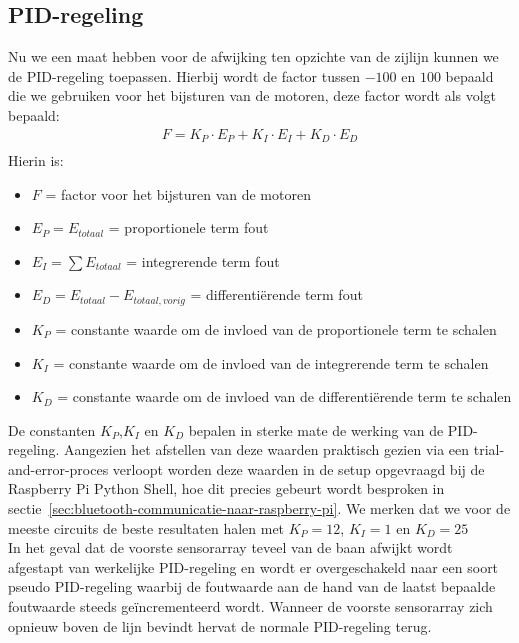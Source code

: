 \subsection{PID-regeling}
Nu we een maat hebben voor de afwijking ten opzichte van de zijlijn kunnen we de PID-regeling toepassen. Hierbij wordt de factor tussen $-100$ en $100$ bepaald die we gebruiken voor het bijsturen van de motoren, deze factor wordt als volgt bepaald:
\begin{gather*}
	F = K_P \cdot E_P + K_I \cdot E_I + K_D \cdot E_D\\
\end{gather*}
Hierin is:
\begin{itemize}
	\item $F$ = factor voor het bijsturen van de motoren
	\item $E_P = E_{totaal}$ = proportionele term fout
	\item $E_I = \sum E_{totaal}$ = integrerende term fout
	\item $E_D = E_{totaal} - E_{totaal,vorig}$ = differenti\"erende term fout
	\item $K_P$ = constante waarde om de invloed van de proportionele term te schalen
	\item $K_I$ = constante waarde om de invloed van de integrerende term te schalen
	\item $K_D$ = constante waarde om de invloed van de differenti\"erende term te schalen
\end{itemize}
De constanten $K_P$,$K_I$ en $K_D$ bepalen in sterke mate de werking van de PID-regeling. Aangezien het afstellen van deze waarden praktisch gezien via een trial-and-error-proces verloopt worden deze waarden in de setup opgevraagd bij de Raspberry Pi Python Shell, hoe dit precies gebeurt wordt besproken in sectie~\vref{sec:bluetooth-communicatie-naar-raspberry-pi}. We merken dat we voor de meeste circuits de beste resultaten halen met $K_P=12$, $K_I=1$ en $K_D=25$\\

In het geval dat de voorste sensorarray teveel van de baan afwijkt wordt afgestapt van werkelijke PID-regeling en wordt er overgeschakeld naar een soort pseudo PID-regeling waarbij de foutwaarde aan de hand van de laatst bepaalde foutwaarde steeds ge\"incrementeerd wordt. Wanneer de voorste sensorarray zich opnieuw boven de lijn bevindt hervat de normale PID-regeling terug.


